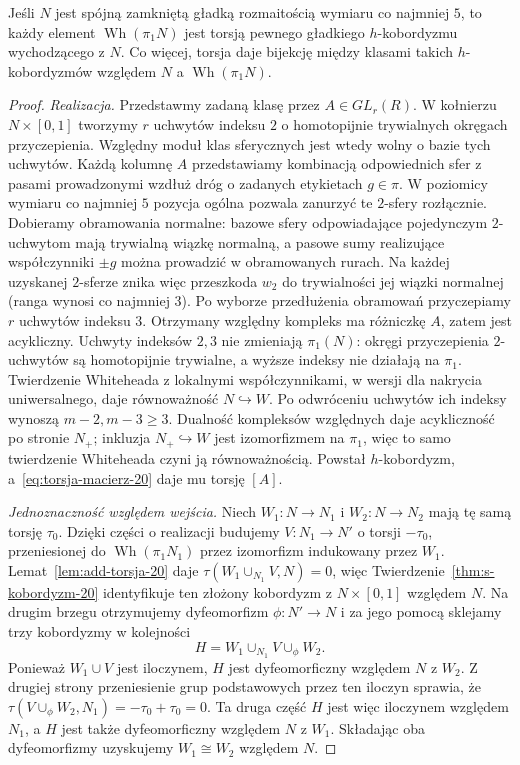 \begin{twierdzenie}
\label{thm:klasyfikacja-hc-20}
Jeśli $N$ jest spójną zamkniętą gładką rozmaitością
wymiaru co najmniej $5$, to każdy element
$\operatorname{Wh}(\pi_1N)$ jest torsją pewnego
gładkiego $h$-kobordyzmu wychodzącego z $N$.
Co więcej, torsja daje bijekcję między klasami
takich $h$-kobordyzmów względem $N$ a
$\operatorname{Wh}(\pi_1N)$.
\end{twierdzenie}
\begin{proof}
\emph{Realizacja.} Przedstawmy zadaną klasę przez
$A\in GL_r(R)$. W kołnierzu $N\times[0,1]$
tworzymy $r$ uchwytów indeksu $2$ o
homotopijnie trywialnych okręgach przyczepienia.
Względny moduł klas sferycznych jest wtedy
wolny o bazie tych uchwytów. Każdą kolumnę
$A$ przedstawiamy kombinacją odpowiednich
sfer z pasami prowadzonymi wzdłuż dróg
o zadanych etykietach $g\in\pi$.
W poziomicy wymiaru co najmniej $5$ pozycja
ogólna pozwala zanurzyć te $2$-sfery rozłącznie.
Dobieramy obramowania normalne: bazowe sfery
odpowiadające pojedynczym $2$-uchwytom mają
trywialną wiązkę normalną, a pasowe sumy
realizujące współczynniki $\pm g$ można prowadzić
w obramowanych rurach. Na każdej uzyskanej
$2$-sferze znika więc przeszkoda $w_2$
do trywialności jej wiązki normalnej
(ranga wynosi co najmniej $3$). Po wyborze
przedłużenia obramowań przyczepiamy
$r$ uchwytów indeksu $3$.
Otrzymany względny kompleks ma różniczkę $A$,
zatem jest acykliczny.
Uchwyty indeksów $2,3$ nie zmieniają
$\pi_1(N)$: okręgi przyczepienia $2$-uchwytów
są homotopijnie trywialne, a wyższe indeksy
nie działają na $\pi_1$. Twierdzenie Whiteheada
z lokalnymi współczynnikami, w wersji dla
nakrycia uniwersalnego, daje równoważność
$N\hookrightarrow W$. Po odwróceniu uchwytów
ich indeksy wynoszą $m-2,m-3\geq3$.
Dualność kompleksów względnych daje
acykliczność po stronie $N_+$; inkluzja
$N_+\hookrightarrow W$ jest izomorfizmem
na $\pi_1$, więc to samo twierdzenie Whiteheada
czyni ją równoważnością. Powstał
$h$-kobordyzm, a~\eqref{eq:torsja-macierz-20}
daje mu torsję $[A]$.

\emph{Jednoznaczność względem wejścia.}
Niech $W_1:N\to N_1$ i $W_2:N\to N_2$ mają tę
samą torsję $\tau_0$. Dzięki części o realizacji
budujemy $V:N_1\to N'$ o torsji $-\tau_0$,
przeniesionej do $\operatorname{Wh}(\pi_1N_1)$
przez izomorfizm indukowany przez $W_1$.
Lemat~\ref{lem:add-torsja-20} daje
$\tau(W_1\cup_{N_1}V,N)=0$, więc
Twierdzenie~\ref{thm:s-kobordyzm-20}
identyfikuje ten złożony kobordyzm z
$N\times[0,1]$ względem $N$.
Na drugim brzegu otrzymujemy dyfeomorfizm
$\phi:N'\to N$ i za jego pomocą sklejamy
trzy kobordyzmy w kolejności
\[
 H=W_1\cup_{N_1}V\cup_\phi W_2.
\]
Ponieważ $W_1\cup V$ jest iloczynem,
$H$ jest dyfeomorficzny względem $N$
z $W_2$. Z drugiej strony przeniesienie
grup podstawowych przez ten iloczyn
sprawia, że $\tau(V\cup_\phi W_2,N_1)
=-\tau_0+\tau_0=0$.
Ta druga część $H$ jest więc iloczynem
względem $N_1$, a $H$ jest także
dyfeomorficzny względem $N$ z $W_1$.
Składając oba dyfeomorfizmy uzyskujemy
$W_1\cong W_2$ względem $N$.
\end{proof}

